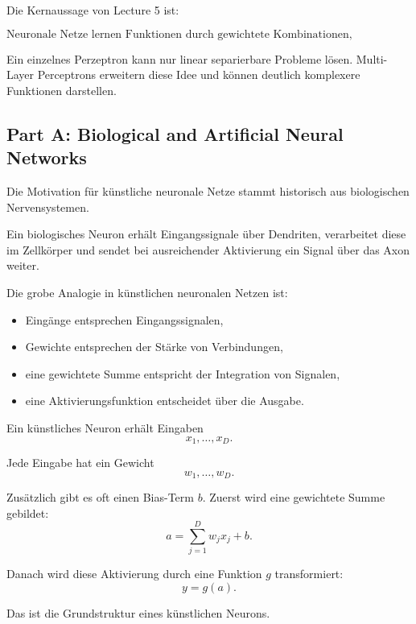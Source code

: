 \documentclass[11pt,a4paper]{scrartcl}
\begin{document}
\begin{answerbox}
    Die Kernaussage von Lecture 5 ist:

    \[
        \boxed{
            \text{Neuronale Netze lernen Funktionen durch gewichtete
            Kombinationen, Nichtlinearitäten und schrittweise Anpassung ihrer Parameter.}
        }
    \]

    Ein einzelnes Perzeptron kann nur linear separierbare Probleme lösen.
    Multi-Layer Perceptrons erweitern diese Idee und können deutlich komplexere
    Funktionen darstellen.
\end{answerbox}

\subsection{Part A: Biological and Artificial Neural Networks}

\begin{notebox}
    Die Motivation für künstliche neuronale Netze stammt historisch aus
    biologischen Nervensystemen.

    Ein biologisches Neuron erhält Eingangssignale über Dendriten, verarbeitet
    diese im Zellkörper und sendet bei ausreichender Aktivierung ein Signal über
    das Axon weiter.

    Die grobe Analogie in künstlichen neuronalen Netzen ist:

    \begin{itemize}
        \item Eingänge entsprechen Eingangssignalen,
        \item Gewichte entsprechen der Stärke von Verbindungen,
        \item eine gewichtete Summe entspricht der Integration von Signalen,
        \item eine Aktivierungsfunktion entscheidet über die Ausgabe.
    \end{itemize}
\end{notebox}

\begin{solutionbox}
    Ein künstliches Neuron erhält Eingaben
    \[
        x_1,\dots,x_D.
    \]

    Jede Eingabe hat ein Gewicht
    \[
        w_1,\dots,w_D.
    \]

    Zusätzlich gibt es oft einen Bias-Term \(b\). Zuerst wird eine gewichtete
    Summe gebildet:
    \[
        a
        =
        \sum_{j=1}^{D} w_j x_j + b.
    \]

    Danach wird diese Aktivierung durch eine Funktion \(g\) transformiert:
    \[
        y
        =
        g(a).
    \]

    Das ist die Grundstruktur eines künstlichen Neurons.
\end{solutionbox}
\end{document}
